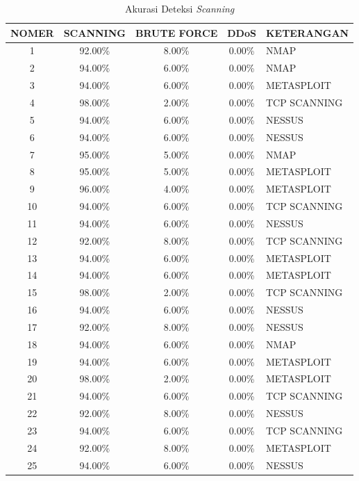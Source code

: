 \begin{table}[H]
	\centering
	\caption{Akurasi Deteksi \emph{Scanning}}
	\label{Akurasi Deteksi Scanning}
	\begin{tabular}{|c|c|c|c|l|}
		\hline
		NOMER         & SCANNING & BRUTE FORCE & DDoS   & KETERANGAN   \\ \hline
		1         & 92.00\%  & 8.00\%      & 0.00\% & NMAP         \\ \hline
		2         & 94.00\%  & 6.00\%      & 0.00\% & NMAP         \\ \hline
		3         & 94.00\%  & 6.00\%      & 0.00\% & METASPLOIT   \\ \hline
		4         & 98.00\%  & 2.00\%      & 0.00\% & TCP SCANNING \\ \hline
		5         & 94.00\%  & 6.00\%      & 0.00\% & NESSUS       \\ \hline
		6         & 94.00\%  & 6.00\%      & 0.00\% & NESSUS       \\ \hline
		7         & 95.00\%  & 5.00\%      & 0.00\% & NMAP         \\ \hline
		8         & 95.00\%  & 5.00\%      & 0.00\% & METASPLOIT   \\ \hline
		9         & 96.00\%  & 4.00\%      & 0.00\% & METASPLOIT   \\ \hline
		10        & 94.00\%  & 6.00\%      & 0.00\% & TCP SCANNING \\ \hline
		11        & 94.00\%  & 6.00\%      & 0.00\% & NESSUS       \\ \hline
		12        & 92.00\%  & 8.00\%      & 0.00\% & TCP SCANNING \\ \hline
		13        & 94.00\%  & 6.00\%      & 0.00\% & METASPLOIT   \\ \hline
		14        & 94.00\%  & 6.00\%      & 0.00\% & METASPLOIT   \\ \hline
		15        & 98.00\%  & 2.00\%      & 0.00\% & TCP SCANNING \\ \hline
		16        & 94.00\%  & 6.00\%      & 0.00\% & NESSUS       \\ \hline
		17        & 92.00\%  & 8.00\%      & 0.00\% & NESSUS       \\ \hline
		18        & 94.00\%  & 6.00\%      & 0.00\% & NMAP         \\ \hline
		19        & 94.00\%  & 6.00\%      & 0.00\% & METASPLOIT   \\ \hline
		20        & 98.00\%  & 2.00\%      & 0.00\% & METASPLOIT   \\ \hline
		21        & 94.00\%  & 6.00\%      & 0.00\% & TCP SCANNING \\ \hline
		22        & 92.00\%  & 8.00\%      & 0.00\% & NESSUS       \\ \hline
		23        & 94.00\%  & 6.00\%      & 0.00\% & TCP SCANNING \\ \hline
		24        & 92.00\%  & 8.00\%      & 0.00\% & METASPLOIT   \\ \hline
		25        & 94.00\%  & 6.00\%      & 0.00\% & NESSUS       \\ \hline
		
	\end{tabular}
\end{table}

